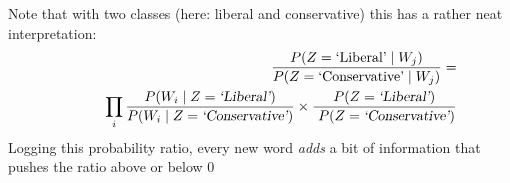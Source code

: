 \documentclass[kp]{foilpack}
\begin{document}
\newpage





Note that with two classes (here: liberal and conservative)  this has a rather neat interpretation:
\begin{align*}
\frac{P(Z=\text{`Liberal'} \mid W_j)}
{P(Z=\text{`Conservative'} \mid W_j)} = \\
~~~~~~~~~\prod_i \frac{P(W_i \mid Z=\textsl{`Liberal'})}
{P(W_i \mid Z=\textsl{`Conservative'})}\times \frac{P(Z=\textsl{`Liberal'})}{~P(Z=\textsl{`Conservative'})}
\end{align*}
Logging this probability ratio, every new word \textsl{adds} a bit of information that pushes the ratio above or below 0
%
%
%
%
%
%
%
%
%
%
%
%
%
%
%
%
%
%
%


\end{document}
